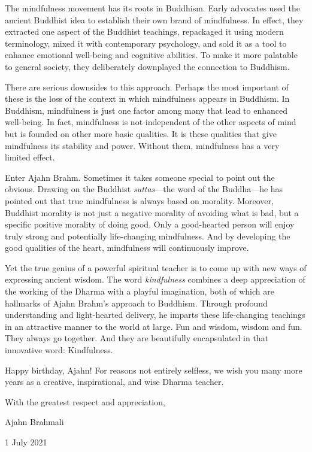 \documentclass[12pt, openany]{book}
\begin{document}
The mindfulness movement has its roots in Buddhism. Early advocates used the ancient Buddhist idea to establish their own brand of mindfulness. In effect, they extracted one aspect of the Buddhist teachings, repackaged it using modern terminology, mixed it with contemporary psychology, and sold it as a tool to enhance emotional well-being and cognitive abilities. To make it more palatable to general society, they deliberately downplayed the connection to Buddhism. 

There are serious downsides to this approach. Perhaps the most important of these is the loss of the context in which mindfulness appears in Buddhism. In Buddhism, mindfulness is just one factor among many that lead to enhanced well-being. In fact, mindfulness is not independent of the other aspects of mind but is founded on other more basic qualities. It is these qualities that give mindfulness its stability and power. Without them, mindfulness has a very limited effect. 

Enter Ajahn Brahm. Sometimes it takes someone special to point out the obvious. Drawing on the Buddhist \emph{suttas}—the word of the Buddha—he has pointed out that true mindfulness is always based on morality. Moreover, Buddhist morality is not just a negative morality of avoiding what is bad, but a specific positive morality of doing good. Only a good-hearted person will enjoy truly strong and potentially life-changing mindfulness. And by developing the good qualities of the heart, mindfulness will continuously improve. 

Yet the true genius of a powerful spiritual teacher is to come up with new ways of expressing ancient wisdom. The word \emph{kindfulness} combines a deep appreciation of the working of the Dharma with a playful imagination, both of which are hallmarks of Ajahn Brahm’s approach to Buddhism. Through profound understanding and light-hearted delivery, he imparts these life-changing teachings in an attractive manner to the world at large. Fun and wisdom, wisdom and fun. They always go together. And they are beautifully encapsulated in that innovative word: Kindfulness. 

Happy birthday, Ajahn! For reasons not entirely selfless, we wish you many more years as a creative, inspirational, and wise Dharma teacher. 


With the greatest respect and appreciation, 


\medskip

Ajahn Brahmali 

1 July 2021 
\end{document}
